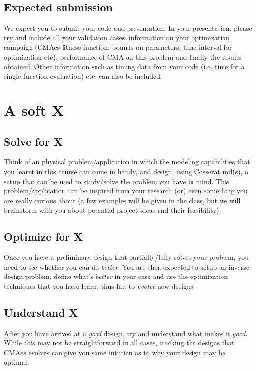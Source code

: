 \documentclass[11pt]{article}
\begin{document}
\subsection{Expected submission}
\label{sec:org893cc4d}
We expect you to submit your code and presentation. In your presentation,
please try and include all your validation cases, information on your
optimization campaign (CMAes fitness function, bounds on parameters, time
interval for optimization etc), performance of CMA on this problem and finally
the results obtained. Other information such as timing data from your code
(i.e. time for a single function evaluation) etc. can also be included.
\section{A soft X}
\label{sec:orgf9fdf95}
\subsection{Solve for X}
\label{sec:org26c9fb9}
Think of an physical problem/application in which the modeling capabilities
that you learnt in this course can come in handy, and design, using Cosserat
rod(s), a setup that can be used to study/solve the problem you have in mind.
This problem/application can be inspired from your research (or) even
something you are really curious about (a few examples will be given in the
class, but we will brainstorm with you about potential project ideas and
their feasibility).
\subsection{Optimize for X}
\label{sec:org5a45be3}
Once you have a preliminary design that partially/fully solves your problem,
you need to see whether you can do \emph{better}. You are then expected to setup an
inverse design problem, define what's \emph{better} in your case and use the
optimization techniques that you have learnt thus far, to \emph{evolve} new
designs.
\subsection{Understand X}
\label{sec:orga9a3b84}
After you have arrived at a \emph{good} design, try and understand what makes it
\emph{good}. While this may not be straightforward in all cases, tracking the designs
that CMAes evolves can give you some intution as to why your design may be optimal.
\end{document}
